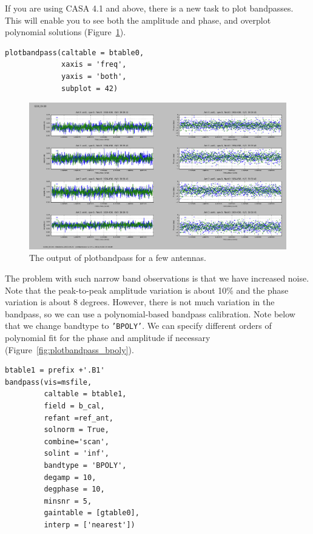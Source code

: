 \documentclass[force,almostfull,justified]{tufte-book}
\begin{document}
If you are using CASA 4.1 and above, there is a new task to plot bandpasses. This will enable you to
see both the amplitude and phase, and overplot polynomial solutions (Figure~\ref{fig:plotbandpass_b}).

\begin{casacmd}
\begin{verbatim}
plotbandpass(caltable = btable0,
             xaxis = 'freq',
             yaxis = 'both',
             subplot = 42)
\end{verbatim}
\end{casacmd}

\begin{figure}
  \includegraphics[width=\textwidth]{images/plotbandpass_b}
  \caption[]{The output of plotbandpass for a few antennas.}
  \forceversofloat
  \label{fig:plotbandpass_b}
\end{figure}

The problem with such narrow band observations is that we have increased noise.  Note that the
peak-to-peak amplitude variation is about 10\% and the phase variation is about 8 degrees.  However,
there is not much variation in the bandpass, so we can use a polynomial-based bandpass calibration.
Note below that we change bandtype to {\tt 'BPOLY'}. We can specify different orders of polynomial fit
for the phase and amplitude if necessary (Figure~\ref{fig:plotbandpass_bpoly}).

\begin{casacmd}
\begin{verbatim}
btable1 = prefix +'.B1'
bandpass(vis=msfile,
         caltable = btable1,
         field = b_cal,
         refant =ref_ant,
         solnorm = True,
         combine='scan',
         solint = 'inf',
         bandtype = 'BPOLY',
         degamp = 10,
         degphase = 10,
         minsnr = 5,
         gaintable = [gtable0],
         interp = ['nearest'])
\end{verbatim}
\end{casacmd}
\end{document}
